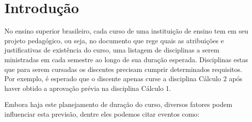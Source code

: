 \chapter{Introdução} \label{chap:introducao} %



No ensino superior brasileiro, cada curso de uma instituição de ensino tem em seu projeto pedagógico, ou seja, no documento que rege quais as atribuições e justificativas de existência do curso, uma listagem de disciplinas a serem ministradas em cada semestre ao longo de sua duração esperada. Disciplinas estas que para serem cursadas os discentes precisam cumprir determinados requisitos. Por exemplo, é esperado que o discente apenas curse a disciplina Cálculo 2 após haver obtido a aprovação prévia na disciplina Cálculo 1.


Embora haja este planejamento de duração do curso, diversos fatores podem influenciar esta previsão, dentre eles podemos citar eventos como:

